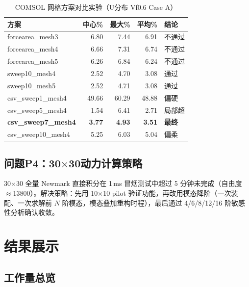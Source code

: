 \documentclass[12pt,a4paper]{ctexart}
\begin{document}
\begin{table}[H]
\centering
\caption{COMSOL 网格方案对比实验（U分布 Vf0.6 Case A）}
\label{tab:comsol-experiments}
\small
\begin{tabular}{p{3.6cm}rrrl}
\toprule
\textbf{方案} & \textbf{中心\%} & \textbf{最大\%} & \textbf{平均\%} & \textbf{结论} \\
\midrule
forcearea\_mesh3 & 6.80 & 7.44 & 6.91 & \textcolor{failred}{不通过} \\
forcearea\_mesh4 & 6.66 & 7.31 & 6.74 & \textcolor{failred}{不通过} \\
forcearea\_mesh5 & 6.26 & 6.84 & 6.24 & \textcolor{failred}{不通过} \\
sweep10\_mesh4 & 2.52 & 4.70 & 3.08 & \textcolor{passgreen}{通过} \\
sweep10\_mesh5 & 2.52 & 4.71 & 3.08 & \textcolor{passgreen}{通过} \\
csv\_sweep1\_mesh4 & 49.66 & 60.29 & 48.88 & \textcolor{failred}{偏硬} \\
csv\_sweep5\_mesh4 & 1.54 & 6.41 & 2.71 & \textcolor{warnblue}{局部超} \\
\rowcolor{lightgray}\textbf{csv\_sweep7\_mesh4} & \textbf{3.77} & \textbf{4.93} & \textbf{3.51} & \textcolor{passgreen}{\textbf{最终}} \\
csv\_sweep10\_mesh4 & 5.25 & 6.03 & 5.04 & \textcolor{failred}{偏柔} \\
\bottomrule
\end{tabular}
\end{table}

\subsection{问题P4：30$\times$30动力计算策略}

30$\times$30 全量 Newmark 直接积分在 1\,ms 冒烟测试中超过 5 分钟未完成（自由度 $\approx13800$）。解决策略：先用 10$\times$10 pilot 验证功能，再改用模态降阶（一次装配、一次求解前 $N$ 阶模态，模态叠加重构时程），最后通过 4/6/8/12/16 阶敏感性分析确认收敛。

\section{结果展示}

\subsection{工作量总览}
\end{document}
